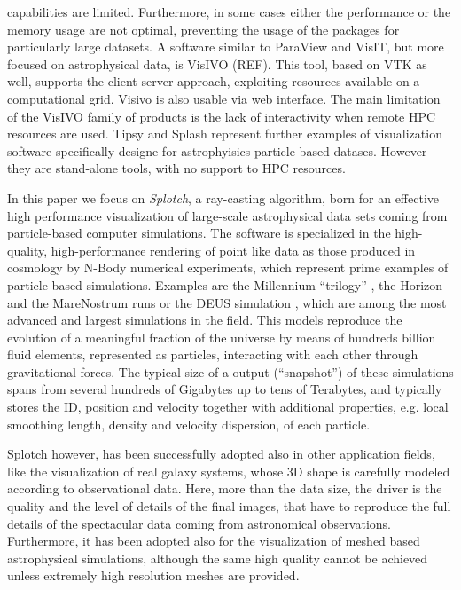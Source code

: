 \documentclass[11pt]{article}
\begin{document}
capabilities are limited. Furthermore, in some cases either the performance or 
the memory usage are not optimal, preventing the usage of the packages for particularly 
large datasets. A software similar to ParaView and VisIT, but more focused on 
astrophysical data, is VisIVO (REF). This tool, based on VTK as well, supports
the client-server approach, exploiting resources available on a computational grid.
Visivo is also usable via web interface. The main limitation of the VisIVO family
of products is the lack of interactivity when remote HPC resources are used.
Tipsy \cite{tipsy} and Splash \cite{splash} represent
further examples of visualization software specifically designe for astrophyisics 
particle based datases. However they are stand-alone tools, with no support to
HPC resources.

In this paper we focus on {\it Splotch}, a ray-casting
algorithm, born for an effective high performance visualization of large-scale 
astrophysical data sets coming from particle-based computer simulations. The software is 
specialized in the high-quality, high-performance rendering of point like data as those 
produced in cosmology by N-Body numerical experiments, which 
represent prime examples of particle-based simulations. Examples are 
the Millennium ``trilogy'' \cite{millennium}, the Horizon and the
MareNostrum runs \cite{horizon} or the DEUS simulation \cite{deus}, which
are among the most advanced and largest simulations in the field. 
This models reproduce the evolution of a meaningful fraction
of the universe by means of hundreds billion fluid elements, represented as particles,
interacting with each other through gravitational
forces. The typical size of a output (``snapshot'') of these simulations spans from several hundreds 
of Gigabytes up to tens of Terabytes, and typically stores the
ID, position and velocity together with additional properties, e.g.
local smoothing length, density and velocity dispersion, of each particle.

Splotch however, has been successfully adopted also in other application fields,
like the visualization of real galaxy systems, whose 3D shape is carefully modeled
according to observational data. Here, more than the data size, the driver is
the quality and the level of details of the final images,
that have to reproduce the full details of the
spectacular data coming from astronomical observations. Furthermore,
it has been adopted also for the visualization of meshed based astrophysical simulations, 
although the same high quality cannot be achieved unless extremely high resolution
meshes are provided. 
\end{document}
